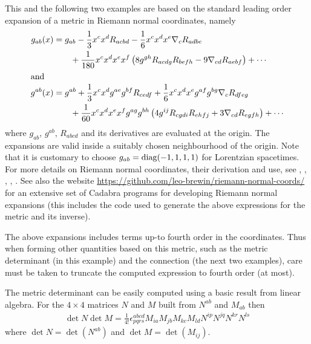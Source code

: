 \documentclass[a4paper,12pt]{article}
\numberwithin{equation}{section}%
\begin{document}
This and the following two examples are based on the standard leading order
expansion of a metric in Riemann normal coordinates, namely
\begin{align}
   g_{ab}(x)
   &= g_{a b}
   - \frac{1}{3} x^{c} x^{d} R_{a c b d}
   - \frac{1}{6} x^{c} x^{d} x^{e} \nabla_{c}{R_{a d b e}}\notag\\
   &\qquad + \frac{1}{180} x^{c} x^{d} x^{e} x^{f}
                           \left( 8g^{g h} R_{a c d g} R_{b e f h}
                                 -9\nabla_{c d}{R_{a e b f}}\right)
   + \cdots
   \label{ex-10:rncgab}\\
\intertext{and}
   g^{ab}(x)
   &= g^{a b}
   + \frac{1}{3} x^{c} x^{d} g^{a e} g^{b f} R_{c e d f}
   + \frac{1}{6} x^{c} x^{d} x^{e} g^{a f} g^{b g} \nabla_{c}{R_{d f e g}}\notag\\
   &\qquad + \frac{1}{60} x^{c} x^{d} x^{e} x^{f} g^{a g} g^{b h}
                          \left( 4 g^{i j} R_{c g d i} R_{e h f j}
                                +3 \nabla_{c d}{R_{e g f h}}\right)
   + \cdots
   \label{ex-10:rnciab}
\end{align}
where $g_{ab}$, $g^{ab}$, $R_{abcd}$ and its derivatives are evaluated at the origin. The
expansions are valid inside a suitably chosen neighbourhood of the origin. Note that it is
customary to choose $g_{ab}={\rm diag}(-1,1,1,1)$ for Lorentzian spacetimes. For more
details on Riemann normal coordinates, their derivation and use, see
\cite{chavel:2006-01},
\cite{chern-chen-lam:2000-01},
\cite{eisenhart:1926-01},
\cite{gray:1973-01}, \cite{willmore:1996-01}.
See also the website \url{https://github.com/leo-brewin/riemann-normal-coords/} for an
extensive set of Cadabra programs for developing Riemann normal expansions (this includes
the code used to generate the above expressions for the metric and its inverse).

The above expansions includes terms up-to fourth order in the coordinates. Thus when forming
other quantities based on this metric, such as the metric determinant (in this example) and
the connection (the next two examples), care must be taken to truncate the computed
expression to fourth order (at most).

The metric determinant can be easily computed using a basic result from linear algebra. For
the $4\times 4$ matrices $N$ and $M$ built from $N^{a b}$ and $M_{a b}$ then
\begin{align*}
   \det N \det M = \frac{1}{4!} \epsilon^{abcd}_{pqrs} M_{ia} M_{jb} M_{kc} M_{ld}
                                                       N^{ip} N^{jq} N^{kr} N^{ls}
\end{align*}
where $\det N = \det(N^{a b})$ and $\det M = \det(M_{i j})$.
\end{document}
